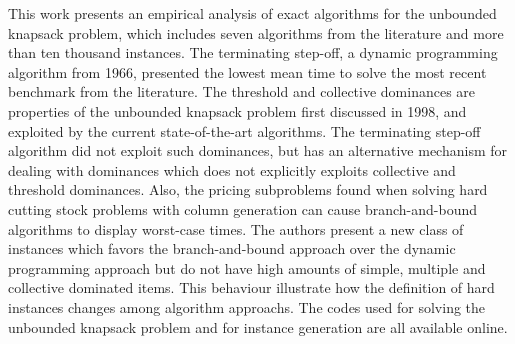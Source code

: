 This work presents an empirical analysis of exact algorithms for the unbounded knapsack problem, which includes seven algorithms from the literature and more than ten thousand instances.
The terminating step-off, a dynamic programming algorithm from 1966, presented the lowest mean time to solve the most recent benchmark from the literature.
The threshold and collective dominances are properties of the unbounded knapsack problem first discussed in 1998, and exploited by the current state-of-the-art algorithms. 
The terminating step-off algorithm did not exploit such dominances, but has an alternative mechanism for dealing with dominances which does not explicitly exploits collective and threshold dominances.
Also, the pricing subproblems found when solving hard cutting stock problems with column generation can cause branch-and-bound algorithms to display worst-case times.
The authors present a new class of instances which favors the branch-and-bound approach over the dynamic programming approach but do not have high amounts of simple, multiple and collective dominated items.
This behaviour illustrate how the definition of hard instances changes among algorithm approachs.
The codes used for solving the unbounded knapsack problem and for instance generation are all available online.
